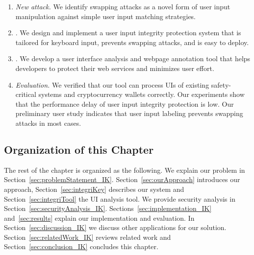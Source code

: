 \begin{enumerate}
    \item \emph{New attack.} We identify swapping attacks as a novel form of user input manipulation against simple user input matching strategies.
    \item \name. We design and implement a user input integrity protection system that is tailored for keyboard input, prevents swapping attacks, and is easy to deploy.
    \item \tool. We develop a user interface analysis and webpage annotation tool that helps developers to protect their web services and minimizes user effort.
    \item \emph{Evaluation.} We verified that our tool can process UIs of existing safety-critical systems and cryptocurrency wallets correctly. Our experiments show that the performance delay of \name user input integrity protection is low. Our preliminary user study indicates that user input labeling prevents swapping attacks in most cases.
\end{enumerate}


\subsection{Organization of this Chapter} The rest of the chapter is organized as the following. We explain our problem in Section~\ref{sec:problemStatement_IK}. Section~\ref{sec:ourApproach} introduces our approach, Section~\ref{sec:integriKey} describes our system and Section~\ref{sec:integriTool} the UI analysis tool. We provide security analysis in Section~\ref{sec:securityAnalysis_IK}. Sections~\ref{sec:implementation_IK} and~\ref{sec:results} explain our implementation and evaluation. In Section~\ref{sec:discussion_IK} we discuss other applications for our solution. Section~\ref{sec:relatedWork_IK} reviews related work and Section~\ref{sec:conclusion_IK} concludes this chapter.




